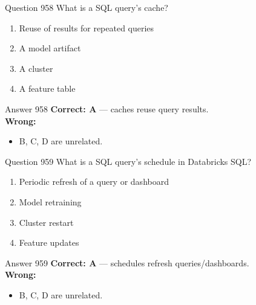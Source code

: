 \documentclass[aspectratio=169,11pt]{beamer}
\begin{document}
	\begin{frame}{Question 958}
		What is a SQL query's cache?
		\begin{enumerate}[label=\Alph*.]
			\item Reuse of results for repeated queries
			\item A model artifact
			\item A cluster
			\item A feature table
		\end{enumerate}
	\end{frame}
	\begin{frame}{Answer 958}
		\textbf{Correct: A} --- caches reuse query results.\\
		\vspace{0.5em}
		\textbf{Wrong:}
		\begin{itemize}
			\item B, C, D are unrelated.
		\end{itemize}
	\end{frame}
	
	\begin{frame}{Question 959}
		What is a SQL query's schedule in Databricks SQL?
		\begin{enumerate}[label=\Alph*.]
			\item Periodic refresh of a query or dashboard
			\item Model retraining
			\item Cluster restart
			\item Feature updates
		\end{enumerate}
	\end{frame}
	\begin{frame}{Answer 959}
		\textbf{Correct: A} --- schedules refresh queries/dashboards.\\
		\vspace{0.5em}
		\textbf{Wrong:}
		\begin{itemize}
			\item B, C, D are unrelated.
		\end{itemize}
	\end{frame}
	
\end{document}
